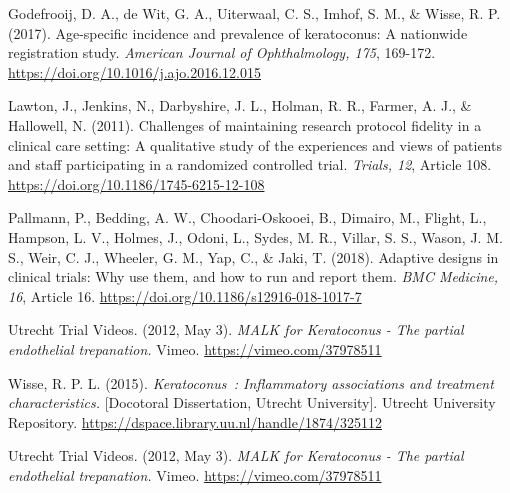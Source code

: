 \documentclass[authordate, empirical]{jote-new-article}
\begin{document}
	Godefrooij, D. A., de Wit, G. A., Uiterwaal, C. S., Imhof, S. M., \& Wisse, R. P. (2017). Age-specific incidence and prevalence of keratoconus: A nationwide registration study. \emph{American Journal of Ophthalmology, 175}, 169-172. \url{https://doi.org/10.1016/j.ajo.2016.12.015}



	Lawton, J., Jenkins, N., Darbyshire, J. L., Holman, R. R., Farmer, A. J., \& Hallowell, N. (2011). Challenges of maintaining research protocol fidelity in a clinical care setting: A qualitative study of the experiences and views of patients and staff participating in a randomized controlled trial. \emph{Trials, 12}, Article 108. \url{https://doi.org/10.1186/1745-6215-12-108}



	Pallmann, P., Bedding, A. W., Choodari-Oskooei, B., Dimairo, M., Flight, L., Hampson, L. V., Holmes, J., Odoni, L., Sydes, M. R., Villar, S. S., Wason, J. M. S., Weir, C. J., Wheeler, G. M., Yap, C., \& Jaki, T. (2018). Adaptive designs in clinical trials: Why use them, and how to run and report them. \emph{BMC Medicine, 16}, Article 16. \url{https://doi.org/10.1186/s12916-018-1017-7}



	Utrecht Trial Videos. (2012, May 3). \emph{MALK for Keratoconus - The partial endothelial trepanation.} Vimeo. \url{https://vimeo.com/37978511}



	Wisse, R. P. L. (2015). \emph{Keratoconus : Inflammatory associations and treatment characteristics.} [Docotoral Dissertation, Utrecht University]. Utrecht University Repository. \url{https://dspace.library.uu.nl/handle/1874/325112}



	Utrecht Trial Videos. (2012, May 3). \emph{MALK for Keratoconus - The partial endothelial trepanation.} Vimeo. \url{https://vimeo.com/37978511}
\end{document}
